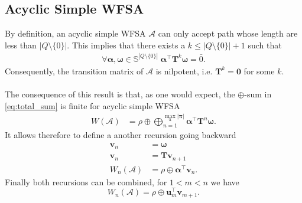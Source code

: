 \subsection{Acyclic Simple WFSA}

By definition, an acyclic simple WFSA $\mathcal{A}$ can only accept path whose length are less than $|Q \setminus \{0\}|$. This implies that there exists a $k \leq |Q \setminus \{0\}| + 1$ such that 
\begin{align}
    \forall \boldsymbol{\alpha}, \boldsymbol{\omega} \in \mathbb{S}^{|Q \setminus \{0\}|} \; \boldsymbol{\alpha}^\top \mathbf{T}^k \boldsymbol{\omega} = \bar{0}.
\end{align}
Consequently, the transition matrix of $\mathcal{A}$ is nilpotent, i.e. $\mathbf{T}^k = \mathbf{0}$ for some $k$.

\paragraph{} The consequence of this result is that, as one would expect, the $\oplus$-sum in \eqref{eq:total_sum} is finite for acyclic simple WFSA
\begin{align}
    W(\mathcal{A}) &= \rho \oplus \bigoplus_{n=1}^{\max_{\boldsymbol{\pi}} |\boldsymbol{\pi}|} \boldsymbol{\alpha}^\top \mathbf{T}^n \boldsymbol{\omega}.
\end{align}
It allows therefore to define a another recursion going backward 
\begin{align}
    \mathbf{v}_n &= \boldsymbol{\omega} \\
    \mathbf{v}_n &= \mathbf{T} \mathbf{v}_{n+1} \\
    W_n(\mathcal{A}) &= \rho \oplus \boldsymbol{\alpha}^\top \mathbf{v}_n.
    \label{eq:sum_paths_rec_swfsa_b}
\end{align}
Finally both recursions can be combined, for $1 < m < n$ we have
\begin{equation}
    W_n(\mathcal{A}) = \rho \oplus \mathbf{u}_m^\top 
    \mathbf{v}_{m+1}.
\end{equation}
 
